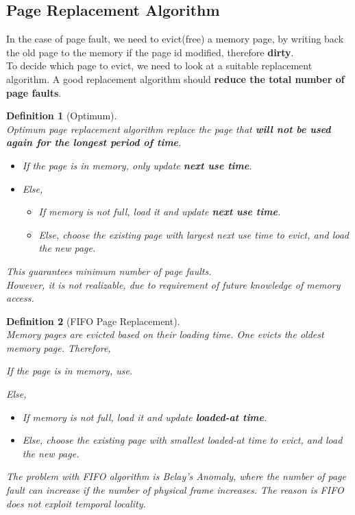 \documentclass[12pt]{article}
\newtheorem{definition}{Definition}[section]
\theoremstyle{definition}
\begin{document}
\subsection{Page Replacement Algorithm}
In the case of page fault, we need to evict(free) a memory page, by writing back the old page to the memory if the page id modified, therefore \textbf{dirty}.\\
To decide which page to evict, we need to look at a suitable replacement algorithm. A good replacement algorithm should \textbf{reduce the total number of page faults}.
\begin{definition}[Optimum]
\hfill\\\normalfont Optimum page replacement algorithm replace the page that \textbf{will not be used again for the longest period of time}.
\begin{itemize}
\item If the page is in memory, only update \textbf{next use time}.
\item Else, 
\begin{itemize}
  \item If memory is not full, load it and update \textbf{next use time}.
  \item Else, choose the existing page with largest next use time to evict, and load the new page.
\end{itemize}
\end{itemize}
This guarantees minimum number of page faults.\\
However, it is not realizable, due to requirement of future knowledge of memory access.
\end{definition}
\begin{definition}[FIFO Page Replacement]
\hfill\\\normalfont Memory pages are evicted based on their loading time. One evicts the oldest memory page. Therefore, 
\item If the page is in memory, use.
\item Else, 
\begin{itemize}
  \item If memory is not full, load it and update \textbf{loaded-at time}.
  \item Else, choose the existing page with smallest loaded-at time to evict, and load the new page.
\end{itemize}
The problem with FIFO algorithm is Belay's Anomaly, where the number of page fault can increase if the number of physical frame increases. The reason is FIFO does not exploit temporal locality. 
\end{definition}
\end{document}
